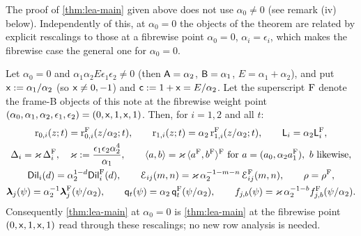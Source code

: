 The proof of \cref{thm:lea-main} given above does not use $\alpha_0\neq 0$ (see remark (iv) below). Independently of this, at $\alpha_0 = 0$ the objects of the theorem are related by explicit rescalings to those at a fibrewise point $\alpha_0 = 0$, $\alpha_i = \epsilon_i$, which makes the fibrewise case the general one for $\alpha_0 = 0$.

\begin{cor}[$\alpha_0 = 0$]
\label{cor:lea-a0}
Let $\alpha_0 = 0$ and $\alpha_1\alpha_2E\epsilon_1\epsilon_2\neq 0$ (then $\mathsf{A} = \alpha_2$, $\mathsf{B} = \alpha_1$, $E = \alpha_1+\alpha_2$), and put $\mathsf{x} := \alpha_1/\alpha_2$ (so $\mathsf{x}\neq 0,-1$) and $\mathsf{c} := 1+\mathsf{x} = E/\alpha_2$. Let the superscript $\mathrm{F}$ denote the frame-B objects of this note at the fibrewise weight point $(\alpha_0,\alpha_1,\alpha_2,\epsilon_1,\epsilon_2) = (0,\mathsf{x},1,\mathsf{x},1)$. Then, for $i = 1,2$ and all $t$:
\begin{gather*}
\mathrm{r}_{0,i}(z;t) = \mathrm{r}^{\mathrm{F}}_{0,i}(z/\alpha_2;t),\qquad \mathrm{r}_{1,i}(z;t) = \alpha_2\,\mathrm{r}^{\mathrm{F}}_{1,i}(z/\alpha_2;t),\qquad \mathsf{L}_i = \alpha_2\mathsf{L}_i^{\mathrm{F}},\\
\Delta_i = \varkappa\,\Delta_i^{\mathrm{F}},\quad \varkappa := \frac{\epsilon_1\epsilon_2\alpha_2^4}{\alpha_1},\qquad
\langle a,b\rangle = \varkappa\,\langle a^{\mathrm{F}},b^{\mathrm{F}}\rangle^{\mathrm{F}}\ \text{for }a = (a_0,\alpha_2a_1^{\mathrm{F}}),\ b\text{ likewise},\\
\mathsf{Dil}_i(d) = \alpha_2^{1-d}\mathsf{Dil}_i^{\mathrm{F}}(d),\qquad \mathcal{E}_{ij}(m,n) = \varkappa\,\alpha_2^{-1-m-n}\,\mathcal{E}_{ij}^{\mathrm{F}}(m,n),\qquad \rho = \rho^{\mathrm{F}},\\
\boldsymbol{\lambda}_j(\psi) = \alpha_2^{-1}\boldsymbol{\lambda}_j^{\mathrm{F}}(\psi/\alpha_2),\qquad \mathsf{q}_{t}(\psi) = \alpha_2\,\mathsf{q}_{t}^{\mathrm{F}}(\psi/\alpha_2),\qquad f_{j,b}(\psi) = \varkappa\,\alpha_2^{-1-b}f^{\mathrm{F}}_{j,b}(\psi/\alpha_2).
\end{gather*}
Consequently \cref{thm:lea-main} at $\alpha_0 = 0$ is \cref{thm:lea-main} at the fibrewise point $(0,\mathsf{x},1,\mathsf{x},1)$ read through these rescalings; no new row analysis is needed.
\end{cor}

